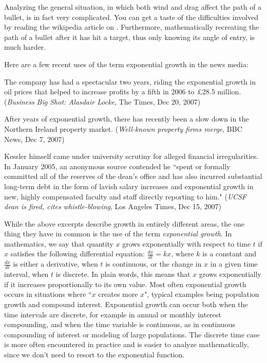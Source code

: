 Analyzing the general situation, in which both wind and drag affect the path of a bullet, is in fact very complicated. You can get a taste of the difficulties involved by reading the wikipedia article on . Furthermore, mathematically recreating the path of a bullet after it has hit a target, thus only knowing its angle of entry, is much harder.




Here are a few recent uses of the term exponential growth in the news media:


The company has had a spectacular two years, riding the exponential growth in oil prices that helped to increase profits by a fifth in 2006 to \pounds 28.5 million. (\emph{Business Big Shot: Alasdair Locke}, The Times, Dec 20, 2007)


After years of exponential growth, there has recently been a slow down in the Northern Ireland property market. (\emph{Well-known property firms merge}, BBC News, Dec 7, 2007)


Kessler himself came under university scrutiny for alleged financial irregularities. In January 2005, an anonymous source contended he ``spent or formally committed all of the reserves of the dean's office and has also incurred substantial long-term debt in the form of lavish salary increases and exponential growth in new, highly compensated faculty and staff directly reporting to him." (\emph{UCSF dean is fired, cites whistle-blowing}, Los Angeles Times, Dec 15, 2007)


While the above excerpts describe growth in entirely different areas, the one thing they have in common is the use of the term \emph{exponential growth}. In mathematics, we say that quantity $x$ grows exponentially with respect to time $t$ if $x$ satisfies the following differential equation: $\frac{dx}{dt}=kx$, where $k$ is a constant and $\frac{dx}{dt}$ is either a derivative, when $t$ is continuous, or the change in $x$ in a given time interval, when $t$ is discrete. In plain words, this means that $x$ grows exponentially if it increases proportionally to its own value. Most often exponential growth occurs in situations where ``$x$ creates more $x$", typical examples being population growth and compound interest. Exponential growth can occur both when the time intervals are discrete, for example in annual or monthly interest compounding, and when the time variable is continuous, as in continuous compounding of interest or modeling of large populations. The discrete time case is more often encountered in practice and is easier to analyze mathematically, since we don't need to resort to the exponential function.


